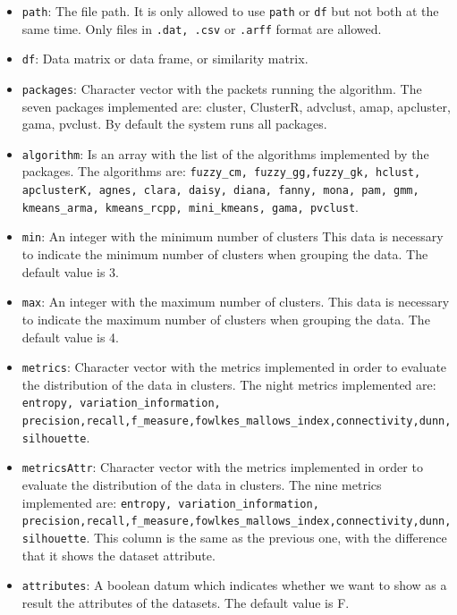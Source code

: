\documentclass[
]{article}
\providecommand{\tightlist}{%
  \setlength{\itemsep}{0pt}\setlength{\parskip}{0pt}}
\begin{document}
\begin{itemize}
\tightlist
\item
  \texttt{path}: The file path. It is only allowed to use \texttt{path}
  or \texttt{df} but not both at the same time. Only files in
  \texttt{.dat, .csv} or \texttt{.arff} format are allowed.
\item
  \texttt{df}: Data matrix or data frame, or similarity matrix.
\item
  \texttt{packages}: Character vector with the packets running the
  algorithm. The seven packages implemented are: cluster, ClusterR,
  advclust, amap, apcluster, gama, pvclust. By default the system runs
  all packages.
\item
  \texttt{algorithm}: Is an array with the list of the algorithms
  implemented by the packages. The algorithms are:
  \texttt{fuzzy\_cm, fuzzy\_gg,fuzzy\_gk, hclust, apclusterK, agnes, clara, daisy, diana, fanny, mona, pam, gmm, kmeans\_arma, kmeans\_rcpp, mini\_kmeans, gama, pvclust}.
\item
  \texttt{min}: An integer with the minimum number of clusters This data
  is necessary to indicate the minimum number of clusters when grouping
  the data. The default value is 3.
\item
  \texttt{max}: An integer with the maximum number of clusters. This
  data is necessary to indicate the maximum number of clusters when
  grouping the data. The default value is 4.
\item
  \texttt{metrics}: Character vector with the metrics implemented in
  order to evaluate the distribution of the data in clusters. The night
  metrics implemented are:
  \texttt{entropy, variation\_information, precision,recall,f\_measure,fowlkes\_mallows\_index,connectivity,dunn,silhouette}.
\item
  \texttt{metricsAttr}: Character vector with the metrics implemented in
  order to evaluate the distribution of the data in clusters. The nine
  metrics implemented are:
  \texttt{entropy, variation\_information, precision,recall,f\_measure,fowlkes\_mallows\_index,connectivity,dunn,silhouette}.
  This column is the same as the previous one, with the difference that
  it shows the dataset attribute.
\item
  \texttt{attributes}: A boolean datum which indicates whether we want
  to show as a result the attributes of the datasets. The default value
  is F.
\end{itemize}
\end{document}

